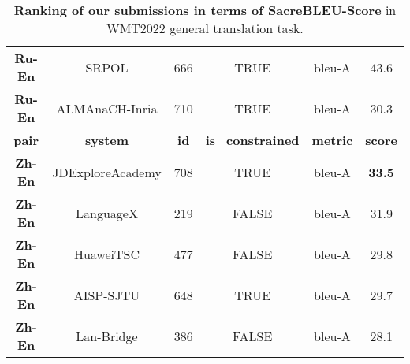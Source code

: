 \documentclass[11pt,a4paper]{article}
\begin{document}
\begin{table*}[t]
{\begin{tabular}{cccccc}
    \textbf{Ru-En} & SRPOL               & 666         & TRUE                    & bleu-A          & 43.6           \\
    \textbf{Ru-En} & ALMAnaCH-Inria      & 710         & TRUE                    & bleu-A          & 30.3           \\ \hline
    \textbf{pair}  & \textbf{system}     & \textbf{id} & \textbf{is\_constrained} & \textbf{metric} & \textbf{score} \\ \hline
    \textbf{Zh-En} & JDExploreAcademy    & 708         & TRUE                    & bleu-A          & \textbf{33.5}  \\
    \textbf{Zh-En} & LanguageX           & 219         & FALSE                   & bleu-A          & 31.9           \\
    \textbf{Zh-En} & HuaweiTSC           & 477         & FALSE                   & bleu-A          & 29.8           \\
    \textbf{Zh-En} & AISP-SJTU           & 648         & TRUE                    & bleu-A          & 29.7           \\
    \textbf{Zh-En} & Lan-Bridge          & 386         & FALSE                   & bleu-A          & 28.1           \\
    \bottomrule
    \end{tabular}}
    \caption{\label{tab:sacrebleu_more} \textbf{Ranking of our submissions in terms of SacreBLEU-Score} in WMT2022 general translation task.}
\end{table*}
\end{document}
